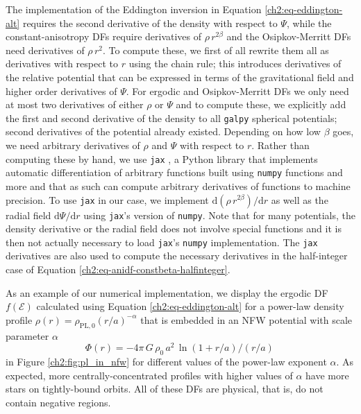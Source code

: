 The implementation of the Eddington inversion in Equation \eqref{ch2:eq-eddington-alt} requires the second derivative of the density with respect to $\Psi$, while the constant-anisotropy DFs require derivatives of $\rho\,r^{2\beta}$ and the Osipkov-Merritt DFs need derivatives of $\rho\,r^{2}$. To compute these, we first of all rewrite them all as derivatives with respect to $r$ using the chain rule; this introduces derivatives of the relative potential that can be expressed in terms of the gravitational field and higher order derivatives of $\Psi$. For ergodic and Osipkov-Merritt DFs we only need at most two derivatives of either $\rho$ or $\Psi$ and to compute these, we explicitly add the first and second derivative of the density to all \texttt{galpy} spherical potentials; second derivatives of the potential already existed. Depending on how low $\beta$ goes, we need arbitrary derivatives of $\rho$ and $\Psi$ with respect to $r$. Rather than computing these by hand, we use \texttt{jax} \parencite{jaxgithub18}, a Python library that implements automatic differentiation of arbitrary functions built using \texttt{numpy} functions and more and that as such can compute arbitrary derivatives of functions to machine precision. To use \texttt{jax} in our case, we implement $\mathrm{d} (\rho\,r^{2\beta})/\mathrm{d} r$ as well as the radial field $\mathrm{d} \Psi / \mathrm{d}r$ using \texttt{jax}'s version of \texttt{numpy}. Note that for many potentials, the density derivative or the radial field does not involve special functions and it is then not actually necessary to load \texttt{jax}'s \texttt{numpy} implementation. The \texttt{jax} derivatives are also used to compute the necessary derivatives in the half-integer case of Equation \eqref{ch2:eq-anidf-constbeta-halfinteger}.

As an example of our numerical implementation, we display the ergodic DF $f(\mathcal{E})$ calculated using Equation \eqref{ch2:eq-eddington-alt} for a power-law density profile $\rho(r) = \rho_{\mathrm{PL},0} (r/a)^{-\alpha}$ that is embedded in an NFW potential with scale parameter $\alpha$
\begin{equation}\label{ch2:eq-nfw-pot}
\Phi(r) = -4\pi\,G\,\rho_0\,a^2\,\ln(1+r/a)/(r/a)\,
\end{equation}
in Figure \ref{ch2:fig:pl_in_nfw} for different values of the power-law exponent $\alpha$. As expected, more centrally-concentrated profiles with higher values of $\alpha$ have more stars on tightly-bound orbits. All of these DFs are physical, that is, do not contain negative regions.

